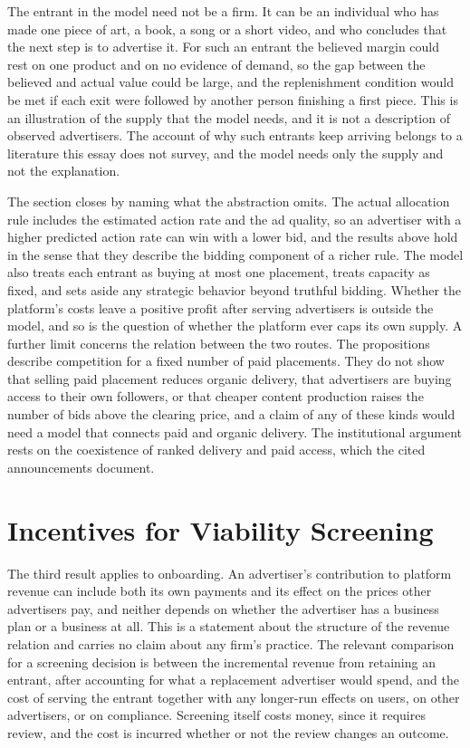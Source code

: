\documentclass[11pt]{article}
\theoremstyle{definition}
\begin{document}
The entrant in the model need not be a firm. It can be an individual who has made one piece of art, a book, a song or a short video, and who concludes that the next step is to advertise it. For such an entrant the believed margin could rest on one product and on no evidence of demand, so the gap between the believed and actual value could be large, and the replenishment condition would be met if each exit were followed by another person finishing a first piece. This is an illustration of the supply that the model needs, and it is not a description of observed advertisers. The account of why such entrants keep arriving belongs to a literature this essay does not survey, and the model needs only the supply and not the explanation.

The section closes by naming what the abstraction omits. The actual allocation rule includes the estimated action rate and the ad quality, so an advertiser with a higher predicted action rate can win with a lower bid, and the results above hold in the sense that they describe the bidding component of a richer rule. The model also treats each entrant as buying at most one placement, treats capacity as fixed, and sets aside any strategic behavior beyond truthful bidding. Whether the platform's costs leave a positive profit after serving advertisers is outside the model, and so is the question of whether the platform ever caps its own supply. A further limit concerns the relation between the two routes. The propositions describe competition for a fixed number of paid placements. They do not show that selling paid placement reduces organic delivery, that advertisers are buying access to their own followers, or that cheaper content production raises the number of bids above the clearing price, and a claim of any of these kinds would need a model that connects paid and organic delivery. The institutional argument rests on the coexistence of ranked delivery and paid access, which the cited announcements document.

\section{Incentives for Viability Screening}

The third result applies to onboarding. An advertiser's contribution to platform revenue can include both its own payments and its effect on the prices other advertisers pay, and neither depends on whether the advertiser has a business plan or a business at all. This is a statement about the structure of the revenue relation and carries no claim about any firm's practice. The relevant comparison for a screening decision is between the incremental revenue from retaining an entrant, after accounting for what a replacement advertiser would spend, and the cost of serving the entrant together with any longer-run effects on users, on other advertisers, or on compliance. Screening itself costs money, since it requires review, and the cost is incurred whether or not the review changes an outcome.
\end{document}
